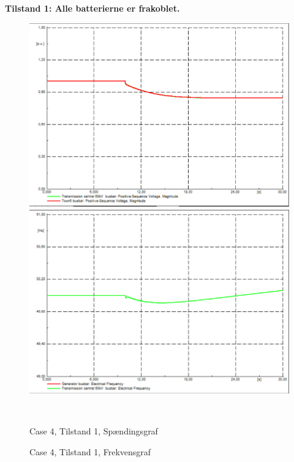 \textbf{Tilstand 1: Alle batterierne er frakoblet.}
\begin{figure}[H]
	\centering
	\begin{minipage}[b]{0.48\textwidth}
		\centering
		\includegraphics[width=1.00\textwidth]{figurer/LargeDisturbance/Voltage1} %
	\end{minipage}
	\hfill
	\begin{minipage}[b]{0.48\textwidth}
		\centering
		\includegraphics[width=1.00\textwidth]{figurer/LargeDisturbance/Freq1} %
	\end{minipage}
	\\ %
	\begin{minipage}[t]{0.48\textwidth}
		\caption{Case 4, Tilstand 1, Spændingsgraf} %
		\label{fig:C4T1V}
	\end{minipage}
	\hfill
	\begin{minipage}[t]{0.48\textwidth}
		\caption{Case 4, Tilstand 1, Frekvensgraf} %
		\label{fig:C4T1F}
	\end{minipage}
\end{figure}

